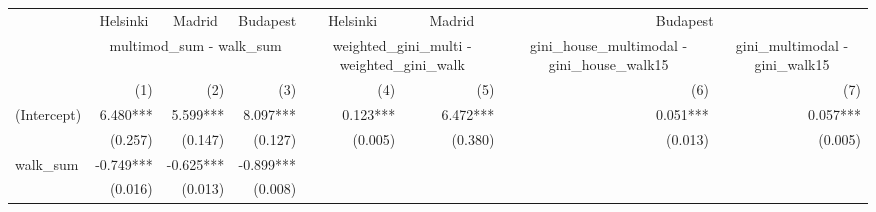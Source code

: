 \begin{tabular}{lrrrrrrr}
\toprule
                                           & \multicolumn{1}{c}{Helsinki} & \multicolumn{1}{c}{Madrid} & \multicolumn{1}{c}{Budapest} &   \multicolumn{1}{c}{Helsinki}   &   \multicolumn{1}{c}{Madrid}   &                                               \multicolumn{2}{c}{Budapest}                                              \\ 
\cmidrule(lr){2-2} \cmidrule(lr){3-3} \cmidrule(lr){4-4} \cmidrule(lr){5-5} \cmidrule(lr){6-6} \cmidrule(lr){7-8} 
                                           &                       \multicolumn{3}{c}{multimod\_sum - walk\_sum}                      &  \multicolumn{2}{c}{weighted\_gini\_multi - weighted\_gini\_walk} & \multicolumn{1}{c}{gini\_house\_multimodal - gini\_house\_walk15} & \multicolumn{1}{c}{gini\_multimodal - gini\_walk15} \\ 
\cmidrule(lr){2-4} \cmidrule(lr){5-6} \cmidrule(lr){7-7} \cmidrule(lr){8-8} 
                                           &                          (1) &                        (2) &                          (3) &                              (4) &                            (5) &                                                               (6) &                                                 (7) \\ 
\midrule
(Intercept)                                &                     6.480*** &                   5.599*** &                     8.097*** &                         0.123*** &                       6.472*** &                                                          0.051*** &                                            0.057*** \\ 
                                           &                      (0.257) &                    (0.147) &                      (0.127) &                          (0.005) &                        (0.380) &                                                           (0.013) &                                             (0.005) \\ 
walk\_sum                                  &                    -0.749*** &                  -0.625*** &                    -0.899*** &                                  &                                &                                                                   &                                                     \\ 
                                           &                      (0.016) &                    (0.013) &                      (0.008) &                                  &                                &                                                                   &                                                     \\ 

\end{tabular}
